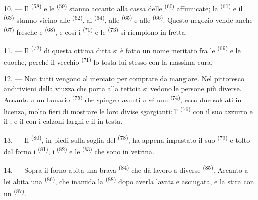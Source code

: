 \VUsaut{4.0mm}
\VUsaut{3.0mm}

10. --- Il  \textsuperscript{(58)} e le 
\textsuperscript{(59)} stanno accanto alla cassa delle 
\textsuperscript{(60)} affumicate; la  \textsuperscript{(61)} e il
 \textsuperscript{(63)} stanno vicino alle 
\textsuperscript{(62)}, ai  \textsuperscript{(64)}, alle
 \textsuperscript{(65)} e alle 
\textsuperscript{(66)}. Questo negozio vende anche 
\textsuperscript{(67)} fresche e  \textsuperscript{(68)}, e così i
 \textsuperscript{(70)} e le 
\textsuperscript{(73)} si riempiono in fretta.

11. --- Il  \textsuperscript{(72)} di questa ottima ditta si è fatto un
nome meritato fra le  \textsuperscript{(69)} e le cuoche, perché il
vecchio  \textsuperscript{(71)} lo tosta lui stesso con la massima
cura.

\VUsaut{4.0mm}
\VUsaut{3.0mm}

12. --- Non tutti vengono al mercato per comprare da mangiare. Nel pittoresco andirivieni
della viuzza che porta alla tettoia si vedono le persone più diverse. Accanto a un
bonario  \textsuperscript{(75)} che spinge davanti a sé una
 \textsuperscript{(74)}, ecco due soldati in licenza, molto fieri di
mostrare le loro divise sgargianti: l' \textsuperscript{(76)} con il suo
 azzurro e il , e il
 con i calzoni larghi e il  in testa.

13. --- Il  \textsuperscript{(80)}, in piedi sulla soglia del
 \textsuperscript{(78)}, ha appena impastato il suo 
\textsuperscript{(79)} e tolto dal forno i  \textsuperscript{(81)}, i
 \textsuperscript{(82)} e le  \textsuperscript{(83)}
che sono in vetrina.

14. --- Sopra il forno abita una brava  \textsuperscript{(84)} che dà
lavoro a diverse  \textsuperscript{(85)}. Accanto a lei abita una
 \textsuperscript{(86)}, che inamida la
 \textsuperscript{(88)} dopo averla lavata e asciugata, e la stira
con un  \textsuperscript{(87)}.

